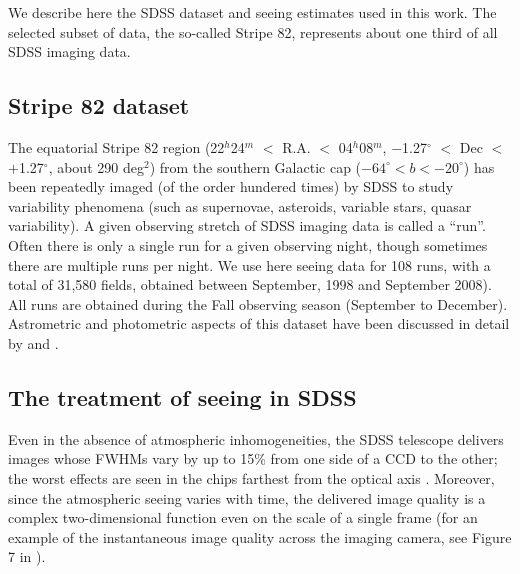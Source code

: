 

We describe here the SDSS dataset and seeing estimates used in this work. The
selected subset of data, the so-called Stripe 82, represents about one third of
all SDSS imaging data. 

\subsection{Stripe 82 dataset} 

The equatorial Stripe 82 region (22$^h$24$^m$ $<$ R.A. $<$ 04$^h$08$^m$, 
$-$1.27$^\circ$  $<$ Dec $<$ $+$1.27$^\circ$, about 
290 deg$^2$) from the southern Galactic cap ($-64^\circ < b <  -20^\circ$) has been repeatedly imaged (of the order
hundered times) by SDSS to study variability phenomena (such as supernovae, asteroids, variable stars, quasar 
variability). A given observing stretch of SDSS imaging data is called a ``run''. Often there is only a single
run for a given observing night, though sometimes there are multiple runs per night. We use here seeing data for 
108 runs, with a total of 31,580 fields, obtained between September, 1998 and September 2008). All
runs are obtained during the Fall observing season (September to December). Astrometric and photometric aspects 
of this dataset have been discussed in detail by \cite{Ivezic2007} and \cite{Sesar2007}. 


\subsection{The treatment of seeing in SDSS}
 
Even in the absence of atmospheric inhomogeneities, the SDSS telescope delivers images whose 
FWHMs vary by up to 15\% from one side of a CCD to the other; the worst effects are seen in 
the chips farthest from the optical axis \citep{Gunn2006}. Moreover, since the atmospheric 
seeing varies with time, the delivered image quality is a complex two-dimensional function 
even on the scale of a single frame (for an example of the instantaneous image quality across 
the imaging camera, see Figure 7 in \citealt{SDSSEDR}). 
 
